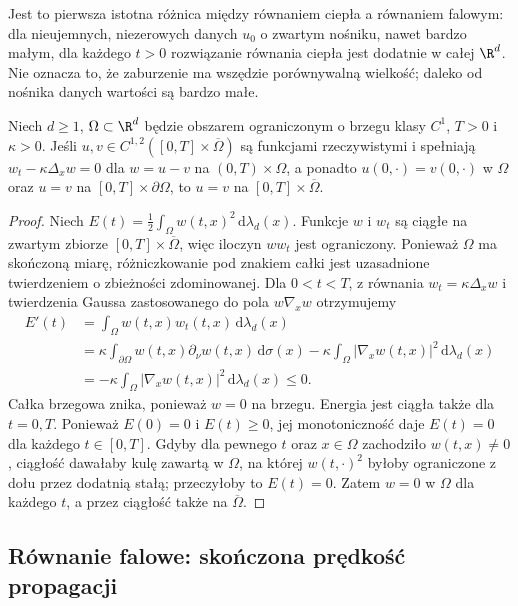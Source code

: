 Jest to pierwsza istotna różnica między równaniem ciepła
a równaniem falowym: dla nieujemnych, niezerowych danych $u_0$
o zwartym nośniku, nawet bardzo małym, dla każdego $t>0$
rozwiązanie równania ciepła jest dodatnie w całej $\R^d$.
Nie oznacza to, że zaburzenie ma wszędzie porównywalną
wielkość; daleko od nośnika danych wartości są bardzo małe.

\begin{stwierdzenie}
\label{prop:heat-uniqueness}
Niech $d\geq1$, $\Omega\subset\R^d$ będzie obszarem ograniczonym
o brzegu klasy $C^1$, $T>0$ i $\kappa>0$.
Jeśli $u,v\in C^{1,2}([0,T]\times\overline\Omega)$ są funkcjami rzeczywistymi i
spełniają $w_t-\kappa\Delta_xw=0$ dla $w=u-v$
na $(0,T)\times\Omega$, a ponadto
$u(0,\cdot)=v(0,\cdot)$ w $\Omega$ oraz
$u=v$ na $[0,T]\times\partial\Omega$, to $u=v$
na $[0,T]\times\overline\Omega$.
\end{stwierdzenie}
\begin{proof}
Niech $E(t)=\frac12\int_\Omega w(t,x)^2\,
\mathrm d\lambda_d(x)$. Funkcje $w$ i $w_t$ są ciągłe na zwartym zbiorze
$[0,T]\times\overline\Omega$, więc iloczyn $ww_t$ jest ograniczony.
Ponieważ $\Omega$ ma skończoną miarę, różniczkowanie pod znakiem
całki jest uzasadnione twierdzeniem o zbieżności zdominowanej.
Dla $0<t<T$, z równania $w_t=\kappa\Delta_xw$ i twierdzenia
Gaussa zastosowanego do pola $w\nabla_xw$ otrzymujemy
\begin{align*}
 E'(t)&=\int_\Omega w(t,x)w_t(t,x)\,\mathrm d\lambda_d(x)\\
 &=\kappa\int_{\partial\Omega}w(t,x)\partial_\nu w(t,x)\,
 \mathrm d\sigma(x)
 -\kappa\int_\Omega|\nabla_xw(t,x)|^2\,\mathrm d\lambda_d(x)\\
 &=-\kappa\int_\Omega|\nabla_xw(t,x)|^2\,\mathrm d\lambda_d(x)\leq0.
\end{align*}
Całka brzegowa znika, ponieważ $w=0$ na brzegu.
Energia jest ciągła także dla $t=0,T$. Ponieważ $E(0)=0$
i $E(t)\geq0$, jej monotoniczność daje $E(t)=0$ dla każdego
$t\in[0,T]$. Gdyby dla pewnego $t$ oraz $x\in\Omega$ zachodziło
$w(t,x)\ne0$, ciągłość dawałaby kulę zawartą w $\Omega$,
na której $w(t,\cdot)^2$ byłoby ograniczone z dołu przez dodatnią
stałą; przeczyłoby to $E(t)=0$. Zatem $w=0$ w $\Omega$
dla każdego $t$, a przez ciągłość także na $\overline\Omega$.
\end{proof}

\subsection{Równanie falowe: skończona prędkość propagacji}

